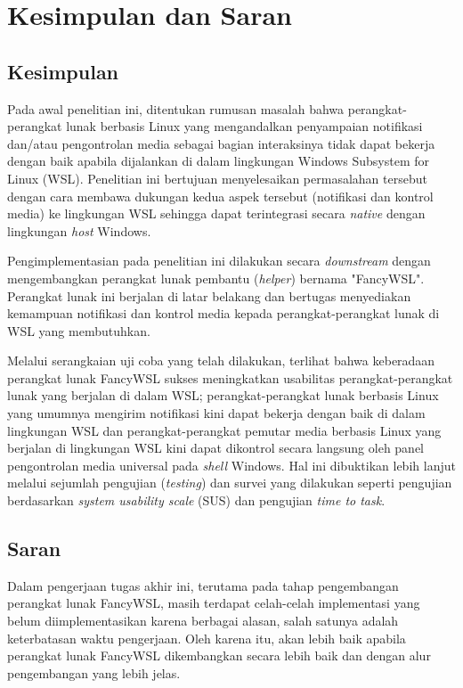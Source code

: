 \chapter{Kesimpulan dan Saran}

\section{Kesimpulan}

Pada awal penelitian ini, ditentukan rumusan masalah bahwa perangkat-perangkat lunak berbasis Linux yang mengandalkan penyampaian notifikasi dan/atau pengontrolan media sebagai bagian interaksinya tidak dapat bekerja dengan baik apabila dijalankan di dalam lingkungan Windows Subsystem for Linux (WSL). Penelitian ini bertujuan menyelesaikan permasalahan tersebut dengan cara membawa dukungan kedua aspek tersebut (notifikasi dan kontrol media) ke lingkungan WSL sehingga dapat terintegrasi secara \textit{native} dengan lingkungan \textit{host} Windows.

Pengimplementasian pada penelitian ini dilakukan secara \textit{downstream} dengan mengembangkan perangkat lunak pembantu (\textit{helper}) bernama "FancyWSL". Perangkat lunak ini berjalan di latar belakang dan bertugas menyediakan kemampuan notifikasi dan kontrol media kepada perangkat-perangkat lunak di WSL yang membutuhkan.

Melalui serangkaian uji coba yang telah dilakukan, terlihat bahwa keberadaan perangkat lunak FancyWSL sukses meningkatkan usabilitas perangkat-perangkat lunak yang berjalan di dalam WSL; perangkat-perangkat lunak berbasis Linux yang umumnya mengirim notifikasi kini dapat bekerja dengan baik di dalam lingkungan WSL dan perangkat-perangkat pemutar media berbasis Linux yang berjalan di lingkungan WSL kini dapat dikontrol secara langsung oleh panel pengontrolan media universal pada \textit{shell} Windows. Hal ini dibuktikan lebih lanjut melalui sejumlah pengujian (\textit{testing}) dan survei yang dilakukan seperti pengujian berdasarkan \textit{system usability scale} (SUS) dan pengujian \textit{time to task}.

\section{Saran}

Dalam pengerjaan tugas akhir ini, terutama pada tahap pengembangan perangkat lunak FancyWSL, masih terdapat celah-celah implementasi yang belum diimplementasikan karena berbagai alasan, salah satunya adalah keterbatasan waktu pengerjaan. Oleh karena itu, akan lebih baik apabila perangkat lunak FancyWSL dikembangkan secara lebih baik dan dengan alur pengembangan yang lebih jelas.
